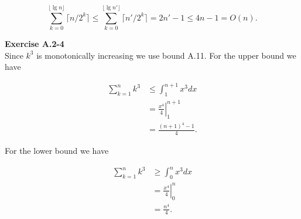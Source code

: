 \documentclass{article}
\begin{document}
\[ \sum_{k=0}^{\lfloor \lg n \rfloor} \lceil n/2^k\rceil \leq \sum_{k=0}^{\lfloor \lg n' \rfloor} \lceil n'/2^k\rceil = 2n' - 1 \leq 4n - 1 = O(n).\]


\noindent\textbf{Exercise A.2-4}\\

Since $k^3$ is monotonically increasing we use bound A.11.  For the upper bound we have

\begin{align*}
\sum_{k=1}^n k^3 &\leq \int_1^{n+1} x^3 dx \\
&= \left.\frac{x^4}{4} \right|_1^{n+1} \\
&= \frac{(n+1)^4 - 1}{4}.
\end{align*}

For the lower bound we have 

\begin{align*}
\sum_{k=1}^n k^3 &\geq \int_0^{n} x^3 dx \\
&= \left.\frac{x^4}{4} \right|_0^n \\
&= \frac{n^4}{4}.
\end{align*}
\end{document}
